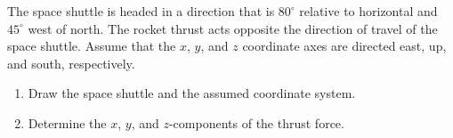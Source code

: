 
The space shuttle is headed in a direction that is $80^\circ$ relative to horizontal and $45^\circ$ west of north. The rocket thrust acts opposite the direction of travel of the space shuttle. Assume that the $x$, $y$, and $z$ coordinate axes are directed east, up, and south, respectively. 
\begin{enumerate}
  \item Draw the space shuttle and the assumed coordinate system.
  \item Determine the $x$, $y$, and $z$-components of the thrust force.
\end{enumerate}

\iftoggle{flagSoln}{%
\vspace{.5cm}
\rule{\textwidth}{.4pt}
\vspace{.5cm}
\textbf{Solution:}
\begin{figure}[ht!]
  \centering
  \texttt{[image: soln.png]}
\end{figure}
}{%
}%
